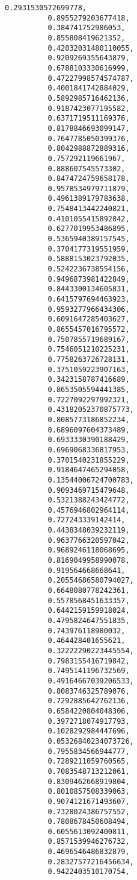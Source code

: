 \documentclass[11pt]{article}
\begin{document}
\begin{Verbatim}[commandchars=\\\{\}]
          0.2931530572699778,
          0.8955279203677418,
          0.384741752986053,
          0.855808419621352,
          0.42032031480110055,
          0.9209269355643879,
          0.6788103330616999,
          0.47227998574574787,
          0.4001841742884029,
          0.5892985716462136,
          0.9187423077195582,
          0.6371719511169376,
          0.8178846693099147,
          0.7647785050399376,
          0.8042988872889316,
          0.757292119661967,
          0.888607545573302,
          0.8474724759658178,
          0.9578534979711879,
          0.4961389179783638,
          0.7548413442240821,
          0.4101055415892842,
          0.6277019953486895,
          0.5365940389157545,
          0.3704177319551959,
          0.5888153023792035,
          0.5242236738554156,
          0.9496873981422849,
          0.8443300134605831,
          0.6415797694463923,
          0.9593277966434306,
          0.6091647285403627,
          0.8655457016795572,
          0.7507855719689167,
          0.7546051210225231,
          0.7758263726728131,
          0.3751059223907163,
          0.3423158787416689,
          0.8653505594441385,
          0.7227092297992321,
          0.43182052370875773,
          0.8085773186852234,
          0.6896097604373489,
          0.6933330390188429,
          0.6969068336817953,
          0.3701540231855229,
          0.9184647465294058,
          0.13544006724700783,
          0.9093469715479648,
          0.5321388243424772,
          0.4576946802964114,
          0.727243339142414,
          0.4438348039232119,
          0.9637766320597042,
          0.9689246118068695,
          0.8169049958990078,
          0.919564668668641,
          0.20554686580794027,
          0.6648080778242361,
          0.5578568451633357,
          0.6442159159918024,
          0.4795824647551835,
          0.743976118980032,
          0.464428401655621,
          0.32222290223445554,
          0.7983155416719842,
          0.7495141196732569,
          0.49164667039206533,
          0.8083746325789076,
          0.7292885642762136,
          0.6584220804048306,
          0.3972718074917793,
          0.1028292984447696,
          0.05326840234073726,
          0.7955834566944777,
          0.7289211059760565,
          0.7083548713212061,
          0.8309462668919804,
          0.8010857508339063,
          0.9074121671493607,
          0.7328024386757552,
          0.7808678450608494,
          0.6055613092400811,
          0.8571539946276732,
          0.4696546486832879,
          0.28327577216456634,
          0.9422403510170754,

\end{Verbatim}
\end{document}
